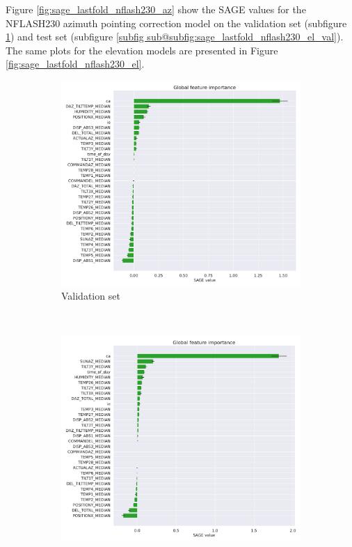 Figure \ref{fig:sage_lastfold_nflash230_az} show the SAGE values for the NFLASH230 azimuth pointing correction model on the validation set (subfigure \ref{subfig:sage_lastfold_nflash230_az_val}) and test set (subfigure \ref{subfig sub@subfig:sage_lastfold_nflash230_el_val}).
The same plots for the elevation models are presented in Figure \ref{fig:sage_lastfold_nflash230_el}.

\begin{figure}[H]
    \centering
    \begin{subfigure}[t]{0.92\textwidth}
        \centering
        \includegraphics[width=\textwidth]{Results/XGB_ds2_tp5_k30_uncorr_az_val_SAGE.pdf}
        \caption{Validation set}
        \label{subfig:sage_lastfold_nflash230_az_val}
    \end{subfigure}
    \\
    \begin{subfigure}[t]{0.92\textwidth}
       \centering
       \includegraphics[width=1\textwidth]{Results/XGB_ds2_tp5_k30_uncorr_az_test_SAGE.pdf}

\end{subfigure}
\end{figure}
